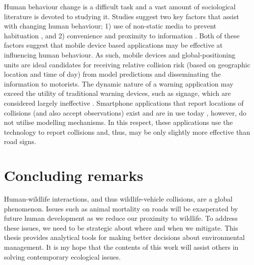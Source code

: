 Human behaviour change is a difficult task and a vast amount of sociological literature is devoted to studying it. Studies suggest two key factors that assist with changing human behaviour; 1) use of non-static media to prevent habituation \citep{}, and 2) convenience and proximity to information \citep{}. Both of these factors suggest that mobile device based applications may be effective at influencing human behaviour. As such, mobile devices and global-positioning units are ideal candidates for receiving relative collision risk (based on geographic location and time of day) from model predictions and disseminating the information to motorists. The dynamic nature of a warning application may exceed the utility of traditional warning devices, such as signage, which are considered largely ineffective \citep{bond13}.  Smartphone applications that report locations of collisions (and also accept observations) exist and are in use today \citep{aane09}, however, do not utilise modelling mechanisms. In this respect, these applications use the technology to report collisions and, thus, may be only slightly more effective than road signs.  

\section{Concluding remarks}

Human-wildlife interactions, and thus wildlife-vehicle collisions, are a global phenomenon. Issues such as animal mortality on roads will be exasperated by future human development as we reduce our proximity to wildlife. To address these issues, we need to be strategic about where and when we mitigate. This thesis provides analytical tools for making better decisions about environmental management. It is my hope that the contents of this work will assist others in solving contemporary ecological issues.